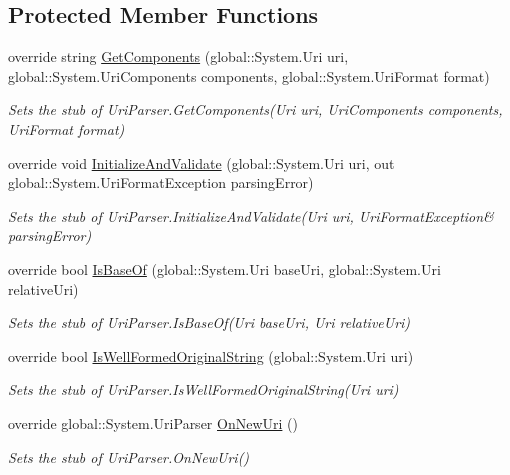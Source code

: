 \subsection*{Protected Member Functions}
\begin{DoxyCompactItemize}
\item 
override string \hyperlink{class_system_1_1_fakes_1_1_stub_uri_parser_a46508f9d8cf377e80e3312626d545125}{Get\-Components} (global\-::\-System.\-Uri uri, global\-::\-System.\-Uri\-Components components, global\-::\-System.\-Uri\-Format format)
\begin{DoxyCompactList}\small\item\em Sets the stub of Uri\-Parser.\-Get\-Components(\-Uri uri, Uri\-Components components, Uri\-Format format)\end{DoxyCompactList}\item 
override void \hyperlink{class_system_1_1_fakes_1_1_stub_uri_parser_a9e5dca3160ea44754ab01707875646fa}{Initialize\-And\-Validate} (global\-::\-System.\-Uri uri, out global\-::\-System.\-Uri\-Format\-Exception parsing\-Error)
\begin{DoxyCompactList}\small\item\em Sets the stub of Uri\-Parser.\-Initialize\-And\-Validate(Uri uri, Uri\-Format\-Exception\& parsing\-Error)\end{DoxyCompactList}\item 
override bool \hyperlink{class_system_1_1_fakes_1_1_stub_uri_parser_a6beb2d283b379b657cc78141ac9be3c6}{Is\-Base\-Of} (global\-::\-System.\-Uri base\-Uri, global\-::\-System.\-Uri relative\-Uri)
\begin{DoxyCompactList}\small\item\em Sets the stub of Uri\-Parser.\-Is\-Base\-Of(\-Uri base\-Uri, Uri relative\-Uri)\end{DoxyCompactList}\item 
override bool \hyperlink{class_system_1_1_fakes_1_1_stub_uri_parser_af3621a4a4b1c96e089a5e264e8b548ed}{Is\-Well\-Formed\-Original\-String} (global\-::\-System.\-Uri uri)
\begin{DoxyCompactList}\small\item\em Sets the stub of Uri\-Parser.\-Is\-Well\-Formed\-Original\-String(\-Uri uri)\end{DoxyCompactList}\item 
override global\-::\-System.\-Uri\-Parser \hyperlink{class_system_1_1_fakes_1_1_stub_uri_parser_ac3e19322991ef88a0b5bea0ce32cc8ee}{On\-New\-Uri} ()
\begin{DoxyCompactList}\small\item\em Sets the stub of Uri\-Parser.\-On\-New\-Uri()\end{DoxyCompactList}\item 

\end{DoxyCompactItemize}
